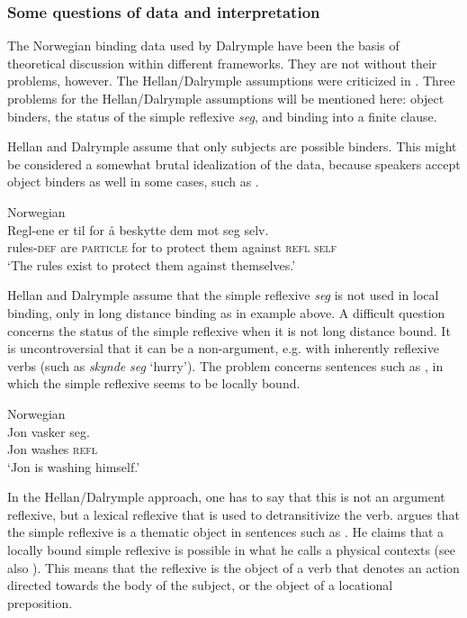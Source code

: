 \documentclass[output=paper,hidelinks]{langscibook}
\begin{document}
\subsubsection{Some questions of data and interpretation}

The Norwegian binding data used by Dalrymple have been the basis of theoretical discussion within different frameworks. They are not without their problems, however. The Hellan/Dalrymple assumptions were criticized in \citet{Lodrup99b,Lodrup07,Lodrup08c}.  Three problems for the Hellan/Dalrymple assumptions will be mentioned here: object binders, the status of the simple reflexive \textit{seg}, and binding into a finite clause.

 Hellan and Dalrymple assume that only subjects are possible binders. This might be considered a somewhat brutal idealization of the data, because speakers accept object binders as well in some cases, such as  \citep{Lodrup08c}.



\ea\label{ex:Scandinavian:111} Norwegian\\
\gll
 {Regl-ene} {er} {til} {for} {å} {beskytte} {dem} {mot} {seg} {selv.}\\
 rules-\textsc{def} are \textsc{particle} for to protect them against \textsc{refl} \textsc{self}\\
\glt `The rules exist to protect them against themselves.' \z

 Hellan and Dalrymple assume that the simple reflexive \textit{seg} is not used in local binding, only in long distance binding as in example  above. A difficult question concerns the status of the simple reflexive when it is not long distance bound. It is uncontroversial that it can be a non-argument, e.g. with inherently reflexive verbs (such as \textit{skynde} \textit{seg} `hurry'). The problem concerns sentences such as , in which the simple reflexive seems to be locally bound.



\ea\label{ex:Scandinavian:112} Norwegian\\
\gll
 {Jon} {vasker} {seg}\textsc{.}\\
 Jon washes \textsc{refl}\\
\glt `Jon is washing himself.'\z

\noindent In the Hellan/Dalrymple approach, one has to say that this is not an argument reflexive, but a lexical reflexive that is used to detransitivize the verb. \citet{Lodrup99b,Lodrup07} argues that the simple reflexive is a thematic object in sentences such as . He claims that a locally bound simple reflexive is possible in what he calls a physical contexts (see also \citealt[279--282]{BresnanEtAl2016}). This means that the reflexive is the object of a verb that denotes an action directed towards the body of the subject, or the object of a locational preposition.
\end{document}
